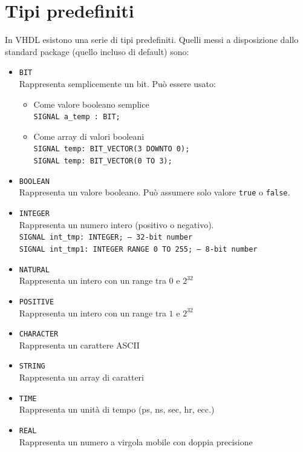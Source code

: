\documentclass[10pt,a4paper,oneside]{scrbook}
\begin{document}
\section{Tipi predefiniti}
In VHDL esistono una serie di tipi predefiniti. Quelli messi a disposizione 
dallo standard package (quello incluso di default) sono:
\begin{itemize}
    \item \texttt{BIT}\\
    Rappresenta semplicemente un bit. Può essere usato:
    \begin{itemize}
        \item Come valore booleano semplice\\
        {\texttt{SIGNAL a_temp : BIT;}}
        \item Come array di valori booleani\\
        {\texttt{SIGNAL temp: BIT_VECTOR(3 DOWNTO 0);}}\\
        {\texttt{SIGNAL temp: BIT_VECTOR(0 TO 3);}}
    \end{itemize}
    
    \item \texttt{BOOLEAN}\\
    Rappresenta un valore booleano. Può assumere solo valore \texttt{true} o 
    \texttt{false}.
    
    \item \texttt{INTEGER}\\
    Rappresenta un numero intero (positivo o negativo).\\
    {\texttt{SIGNAL int_tmp: INTEGER; -- 32-bit number}}\\
    {\texttt{SIGNAL int_tmp1: INTEGER RANGE 0 TO 255; -- 8-bit number}}
    
    \item \texttt{NATURAL}\\
    Rappresenta un intero con un range tra $0$ e $2^32$
    
    \item \texttt{POSITIVE}\\
    Rappresenta un intero con un range tra $1$ e $2^32$
    
    \item \texttt{CHARACTER}\\
    Rappresenta un carattere ASCII
    
    \item \texttt{STRING}\\
    Rappresenta un array di caratteri
    
    \item \texttt{TIME}\\
    Rappresenta un unità di tempo (ps, ns, sec, hr, ecc.)
    
    \item \texttt{REAL}\\
    Rappresenta un numero a virgola mobile con doppia precisione
\end{itemize}
\end{document}
